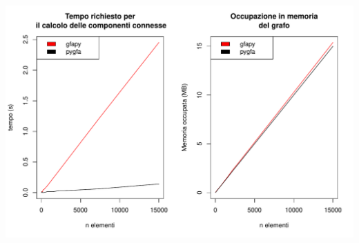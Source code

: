 \documentclass{beamer}
\begin{document}
\begin{frame}{\secname}
\begin{columns}
\begin{column}{0.5\textwidth}
			\centering
			\includegraphics[height=0.45\textheight, width=\textwidth, keepaspectratio]{comparison}
		\end{column}
	\end{columns}
\end{frame}

\end{document}
